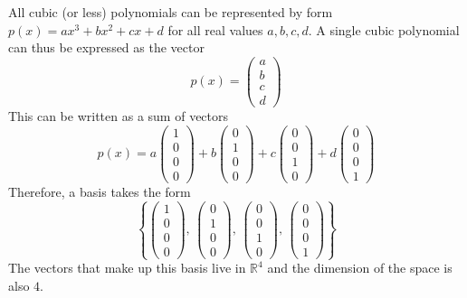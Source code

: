 \documentclass{article}
\begin{document}
All cubic (or less) polynomials can be represented by form $ p(x) = ax^3 +
bx^2 + cx + d $ for all real values $ a, b, c, d $. A single cubic polynomial
can thus be expressed as the vector
$$ p(x) = \begin{pmatrix}
    a \\
    b \\
    c \\
    d
\end{pmatrix} $$
This can be written as a sum of vectors
$$ p(x) = a \begin{pmatrix}
    1 \\
    0 \\
    0 \\
    0
\end{pmatrix} + b \begin{pmatrix}
    0 \\
    1 \\
    0 \\
    0
\end{pmatrix} + c \begin{pmatrix}
    0 \\
    0 \\
    1 \\
    0
\end{pmatrix} + d \begin{pmatrix}
    0 \\
    0 \\
    0 \\
    1
\end{pmatrix} $$
Therefore, a basis takes the form
$$ \left\{\begin{pmatrix}
    1 \\
    0 \\
    0 \\
    0
\end{pmatrix},\, \begin{pmatrix}
    0 \\
    1 \\
    0 \\
    0
\end{pmatrix},\, \begin{pmatrix}
    0 \\
    0 \\
    1 \\
    0
\end{pmatrix},\, \begin{pmatrix}
    0 \\
    0 \\
    0 \\
    1
\end{pmatrix} \right\} $$
The vectors that make up this basis live in $ \mathbb{R}^4 $ and the
dimension of the space is also $ 4 $.
\end{document}
